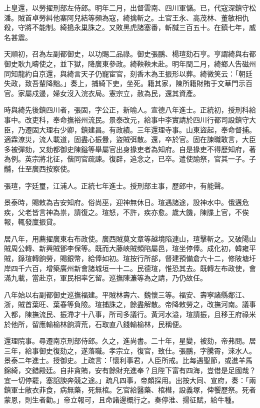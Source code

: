 \begin{pinyinscope}
上皇還，以勞擢刑部左侍郎。明年二月，出督雲南、四川軍儲。已，代寇深鎮守松潘。賊首卓勞糾他寨阿兒結等頻為寇，綺擒斬之。土官王永、高茂林、董敏相仇殺，守將不能制。綺搗永巢誅之。又敗黑虎諸塞番，斬馘三百五十。在鎮七年，威名甚震。

天順初，召為左副都御史，以功賜二品祿。御史張鵬、楊瑄劾石亨。亨謂綺與右都御史耿九疇使之，並下獄，降廣東參政。綺鞅鞅未赴。明年閏二月，綺鄉人告磁州同知龍約自京還，與綺言天子仍寵宦官，刻香木為王振形以葬。綺微笑云：「朝廷失政，致吾輩降黜。」奏上，捕綺下吏，坐死。籍其家，陳所籍財賄于文華門示百官。家屬戍邊，婦女沒入浣衣局。憲宗立，赦為民，還其資產。

時與綺先後鎮四川者，張固，字公正，新喻人。宣德八年進士。正統初，授刑科給事中。改吏科，奉命撫裕州流民。景泰改元，給事中李實請於四川行都司設鎮守大臣，乃遷固大理右少卿，鎮建昌。有政績。三年還理寺事。山東盜起，奉命督捕。適霖潦災，流人載道，固盡心振釁，盜賊弭散。還，卒於官。固在諫職敢言，大臣多被彈劾，又劾都御史陳鎰等舉屬官出身掾吏者為知府。自是掾吏不得歷知府，著為例。英宗將北征，偕同官疏諫。復辟，追念之，已卒。遣使諭祭，官其一子。子黼，仕至廣西按察使。

張瑄，字廷璽，江浦人。正統七年進士。授刑部主事，歷郎中，有能聲。

景泰時，賜敕為吉安知府。俗尚巫，迎神無休日。瑄遇諸途，設神水中。俄遘危疾，父老皆言神為祟，請復之。瑄怒，不許，疾亦愈。歲大饑，陳牒上官，不俟報，輒發廩振貸。

居八年，用薦擢廣東右布政使。廣西賊莫文章等越境陷連山，瑄擊斬之。又破陽山賊周公轉、新興賊鄧李保等。既而大藤峽賊頻陷屬邑，瑄坐停俸。成化初，韓雍平賊，錄瑄轉餉勞，賜銀幣，給俸如初。瑄按行所部，督建預備倉六十二，修陂塘圩岸四千六百，增築廣州新會諸城垣一十二。民德瑄，惟恐其去。既轉左布政使，會滿九載，當赴京，軍民相率乞留。巡撫陳濂等為之請，乃仍故任。

八年始以右副都御史巡撫福建。平賊林壽六、魏懷三等。福安、壽寧諸縣鄰江、浙，賊首葉旺、葉春等負險。瑄捕誅之，餘盡解散。帝降敕勞之，改撫河南。議事入都，陳撫流民、振滯才十八事，所司多議行。黃河水溢，瑄請振，且移王府祿米於他所，留應輸榆林餉濟荒，石取直八錢輸榆林，民稱便。

還理院事。尋遷南京刑部侍郎。久之，進尚書。二十年，星變，被劾，帝弗問。居三年，給事御史復劾之，遂落職。孝宗立，復官，致仕。張鵬，字騰霄，淶水人。景泰二年進士。授御史。上疏言：「懷利事君，人臣所戒。比每遇聖節，或進羊馬錦綺，交錯殿廷。自非貪賄，安有餘財充進奉？且陛下富有四海，豈借是足國哉？宜一切停罷，塞諂諛奔競之途。」疏凡四事，帝頗採用。出按大同、宣府，奏：「兩鎮軍士敝衣菲食，病無藥，死無棺。乞官給醫藥、棺槥，設義塚，俾饗歷祭。死者蒙恩，則生者勸。」帝立報可，且命諸邊概行之。奏停淮、揚征賦，給牛種。


\end{pinyinscope}
